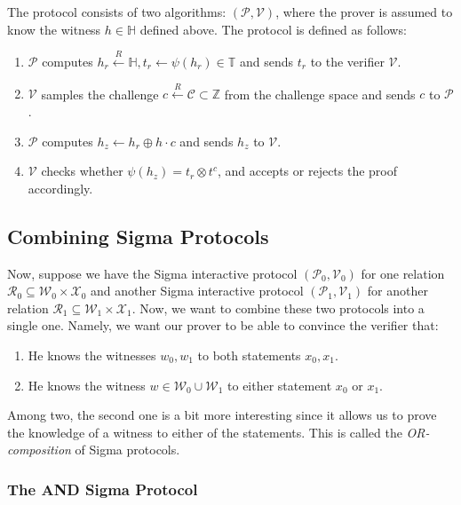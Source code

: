\documentclass[../lecture-notes.tex]{subfiles}
\begin{document}
\begin{definition}
    The protocol consists of two algorithms: $(\mathcal{P}, \mathcal{V})$, where the prover is assumed to know the witness $h \in \mathbb{H}$ defined above. The protocol is defined as follows:
    \begin{enumerate}
        \item $\mathcal{P}$ computes $h_r \xleftarrow{R} \mathbb{H}, t_r \gets \psi(h_r) \in \mathbb{T}$ and sends $t_r$ to the verifier $\mathcal{V}$.
        \item $\mathcal{V}$ samples the challenge $c \xleftarrow{R} \mathcal{C} \subset \mathbb{Z}$ from the challenge space and sends $c$ to $\mathcal{P}$.
        \item $\mathcal{P}$ computes $h_z \gets h_r \oplus h\cdot c$ and sends $h_z$ to $\mathcal{V}$.
        \item $\mathcal{V}$ checks whether $\psi(h_z) = t_r \otimes t^c$, and accepts or rejects the proof accordingly.
    \end{enumerate}
\end{definition}

\subsection{Combining Sigma Protocols}

Now, suppose we have the Sigma interactive protocol $(\mathcal{P}_0,\mathcal{V}_0)$ for one relation $\mathcal{R}_0 \subseteq \mathcal{W}_0 \times \mathcal{X}_0$ and another Sigma interactive protocol $(\mathcal{P}_1,\mathcal{V}_1)$ for another relation $\mathcal{R}_1 \subseteq \mathcal{W}_1 \times \mathcal{X}_1$. Now, we want to combine these two protocols into a single one. Namely, we want our prover to be able to convince the verifier that:
\begin{enumerate}
    \item He knows the witnesses $w_0,w_1$ to both statements $x_0,x_1$.
    \item He knows the witness $w \in \mathcal{W}_0 \cup \mathcal{W}_1$ to either statement $x_0$ or $x_1$.
\end{enumerate}

Among two, the second one is a bit more interesting since it allows us to prove the knowledge of a witness to either of the statements. This is called the \textit{OR-composition} of Sigma protocols.

\subsubsection{The AND Sigma Protocol}
\end{document}
